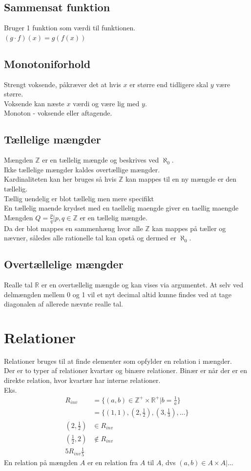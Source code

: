 \documentclass[12pt, a4paper]{article}
\begin{document}
				\subsection{Sammensat funktion}
					Bruger 1 funktion som værdi til funktionen.\\
					$(g\cdot f)(x)=g(f(x))$
				\subsection{Monotoniforhold}
					Strengt voksende, påkræver det at hvis $x$ er større end tidligere skal $y$ være større.\\
					Voksende kan næste $x$ værdi og være lig med $y$.\\
					Monoton - voksende eller aftagende.
				\subsection{Tællelige mængder}
					Mængden $\mathbb{Z}$ er en tællelig mængde og beskrives ved $\aleph_0$.\\
					Ikke tællelige mængder kaldes overtællige mængder.\\
					Kardinaliteten kan her bruges så hvis $\mathbb{Z}$ kan mappes til en ny mængde er den tællelig.\\
					Tællig uendelig er blot tællelig men mere specifikt\\
					En tællelig maende krydset med en taellelig maengde giver en taellig maengde\\
					Mængden $Q = {\frac{p}{q}|p,q\in \mathbb{Z}}$ er en tællelig mængde.\\
					Da der blot mappes en sammenhæng hvor alle $\mathbb{Z}$ kan mappes på tæller og nævner, således alle rationelle tal kan opstå og dermed er $\aleph_0$.
				\subsection{Overtællelige mængder}
					Realle tal $\mathbb{R}$ er en overtællelig mængde og kan vises via argumentet. At selv ved delmængden mellem 0 og 1 vil et nyt decimal altid kunne findes ved at tage diagonalen af allerede nævnte realle tal.
			\section{Relationer}
				Relationer bruges til at finde elementer som opfylder en relation i mængder.\\
				Der er to typer af relationer kvartær og binære relationer. Binær er når der er en direkte relation, hvor kvartær har interne relationer.\\
				Eks. 
				\begin{align*}
					R_{inv}&=\{(a,b)\in \mathbb{Z}^+\times\mathbb{R}^+|b=\frac{1}{a}\}\\
					&=\{(1,1),(2,\frac{1}{2}),(3,\frac{1}{3}),...\}\\
					(2,\frac{1}{2})&\in R_{inv}\\
					(\frac{1}{2},2)&\notin R_{inv}\\
					5R_{inv}\frac{1}{5}
				\end{align*}
				En relation på mængden $A$  er en relation fra $A$ til $A$, dvs $(a,b)\in A\times A|...$
\end{document}
